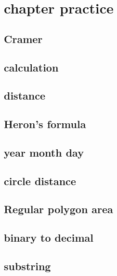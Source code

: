 \section{chapter practice}
    \subsection{Cramer}
            
    \subsection{calculation}
        
    \subsection{distance}
        
    \subsection{Heron's formula}
        
    \subsection{year month day}
        
    \subsection{circle distance}
        
    \subsection{Regular polygon area}
        
    \subsection{binary to decimal}
        
    \subsection{substring}
        

